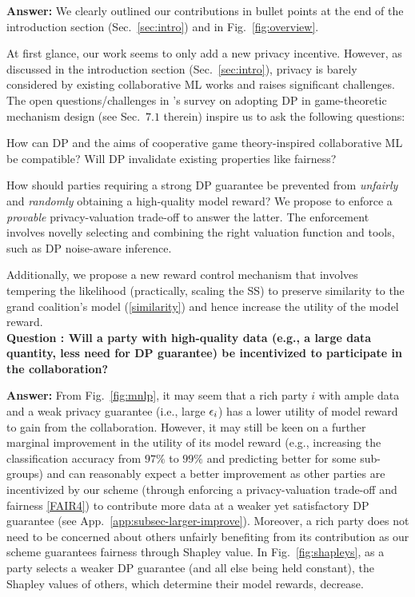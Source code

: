 \documentclass{article}
\theoremstyle{plain}
\theoremstyle{definition}
\theoremstyle{remark}
\begin{document}
\textbf{Answer:} 
We clearly outlined our contributions in bullet points at the end of the introduction section (Sec.~\ref{sec:intro}) and in Fig.~\ref{fig:overview}.

At first glance, our work seems to only add a new privacy incentive. However, as discussed in the introduction section (Sec.~\ref{sec:intro}), privacy is barely considered by existing collaborative ML works and raises significant challenges. The open questions/challenges in \cite{Yu21}'s survey on adopting DP in game-theoretic mechanism design (see Sec.~$7.1$ therein) inspire us to ask the following questions:
\squishlisttwo
\item How can DP and the aims of cooperative game theory-inspired collaborative ML be compatible? Will DP invalidate existing properties like fairness? 
\item How should parties requiring a strong DP guarantee be prevented from \emph{unfairly} and \emph{randomly} obtaining a high-quality model reward? 
\squishend
We propose to enforce a \emph{provable} privacy-valuation trade-off to answer the latter. The enforcement involves novelly selecting and combining the right valuation function and tools, such as DP noise-aware inference.

Additionally, we propose a new reward control mechanism that involves tempering the likelihood (practically, scaling the SS) to preserve similarity to the grand coalition's model (\ref{similarity}) and hence increase the utility of the model reward.\\ 

\textbf{Question : Will a party with high-quality data (e.g., a large data quantity, less need for DP guarantee) be incentivized to participate in the collaboration?}

\textbf{Answer:} 
From Fig.~\ref{fig:mnlp}, it may seem that a rich party $i$ with ample data and a weak privacy guarantee (i.e., large ${\epsilon}_i$) has a lower utility of model reward to gain from the collaboration.
However, it may still be keen on a further marginal improvement in the utility of its model reward (e.g., increasing the classification accuracy from $97\%$ to $99\%$ and predicting better for some sub-groups) and can reasonably expect a better improvement as other parties are incentivized by our scheme (through enforcing a privacy-valuation trade-off and fairness \ref{FAIR4}) to contribute more data at a weaker yet satisfactory DP guarantee (see App.~\ref{app:subsec-larger-improve}).
Moreover, a rich party does not need to be concerned about others unfairly benefiting from its contribution as our scheme guarantees fairness through Shapley value. In Fig.~\ref{fig:shapleys}, as a party selects a weaker DP guarantee (and all else being held constant), the Shapley values of others, which determine their model rewards, decrease.\\
\end{document}

